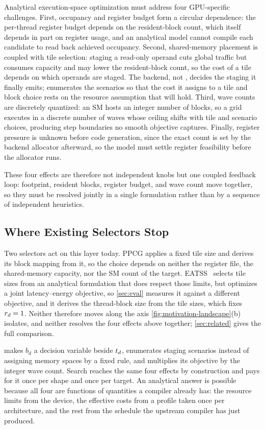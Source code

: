Analytical execution-space optimization must address four GPU-specific challenges. First, occupancy and register budget form a circular dependence: the per-thread register budget depends on the resident-block count, which itself depends in part on register usage, and an analytical model cannot compile each candidate to read back achieved occupancy. Second, shared-memory placement is coupled with tile selection: staging a read-only operand cuts global traffic but consumes capacity and may lower the resident-block count, so the cost of a tile depends on which operands are staged. The backend, not \name, decides the staging it finally emits; \name enumerates the scenarios so that the cost it assigns to a tile and block choice rests on the resource assumption that will hold. Third, wave counts are discretely quantized: an SM hosts an integer number of blocks, so a grid executes in a discrete number of waves whose ceiling shifts with tile and scenario choices, producing step boundaries no smooth objective captures. Finally, register pressure is unknown before code generation, since the exact count is set by the backend allocator afterward, so the model must settle register feasibility before the allocator runs.

These four effects are therefore not independent knobs but one coupled feedback loop: footprint, resident blocks, register budget, and wave count move together, so they must be resolved jointly in a single formulation rather than by a sequence of independent heuristics.

\subsection{Where Existing Selectors Stop}
\label{sec:bg-gap}

Two selectors act on this layer today. PPCG applies a fixed tile size and derives its block mapping from it, so the choice depends on neither the register file, the shared-memory capacity, nor the SM count of the target. EATSS~\cite{eatss} selects tile sizes from an analytical formulation that does respect those limits, but optimizes a joint latency--energy objective, so \autoref{sec:eval} measures it against a different objective, and it derives the thread-block size from the tile sizes, which fixes \(r_d=1\). Neither therefore moves along the axis \autoref{fig:motivation-landscape}(b) isolates, and neither resolves the four effects above together; \autoref{sec:related} gives the full comparison.

\name makes \(b_d\) a decision variable beside \(t_d\), enumerates staging scenarios instead of assigning memory spaces by a fixed rule, and multiplies its objective by the integer wave count. Search reaches the same four effects by construction and pays for it once per shape and once per target. An analytical answer is possible because all four are functions of quantities a compiler already has: the resource limits from the device, the effective costs from a profile taken once per architecture, and the rest from the schedule the upstream compiler has just produced.

